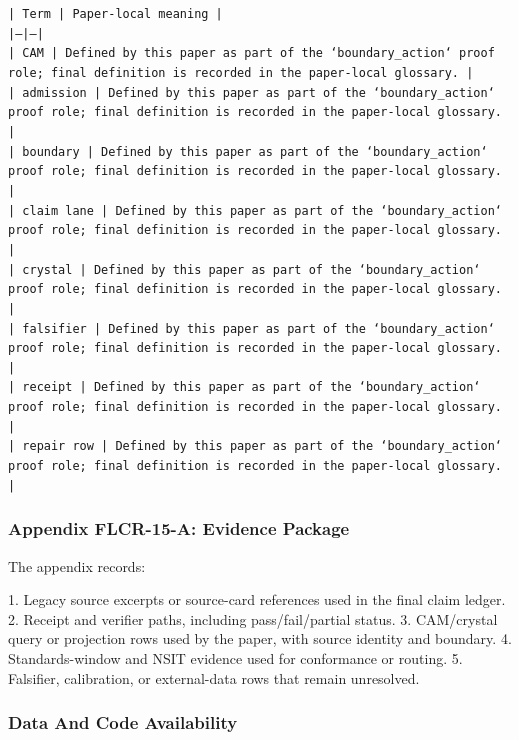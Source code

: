 \documentclass[11pt]{article}
\begin{document}
\noindent\texttt{| Term | Paper-local meaning |}\\
\noindent\texttt{|---|---|}\\
\noindent\texttt{| CAM | Defined by this paper as part of the `boundary\_action` proof role; final definition is recorded in the paper-local glossary. |}\\
\noindent\texttt{| admission | Defined by this paper as part of the `boundary\_action` proof role; final definition is recorded in the paper-local glossary. |}\\
\noindent\texttt{| boundary | Defined by this paper as part of the `boundary\_action` proof role; final definition is recorded in the paper-local glossary. |}\\
\noindent\texttt{| claim lane | Defined by this paper as part of the `boundary\_action` proof role; final definition is recorded in the paper-local glossary. |}\\
\noindent\texttt{| crystal | Defined by this paper as part of the `boundary\_action` proof role; final definition is recorded in the paper-local glossary. |}\\
\noindent\texttt{| falsifier | Defined by this paper as part of the `boundary\_action` proof role; final definition is recorded in the paper-local glossary. |}\\
\noindent\texttt{| receipt | Defined by this paper as part of the `boundary\_action` proof role; final definition is recorded in the paper-local glossary. |}\\
\noindent\texttt{| repair row | Defined by this paper as part of the `boundary\_action` proof role; final definition is recorded in the paper-local glossary. |}\\

\subsubsection*{Appendix FLCR-15-A: Evidence Package}

The appendix records:

1. Legacy source excerpts or source-card references used in the final claim ledger.
2. Receipt and verifier paths, including pass/fail/partial status.
3. CAM/crystal query or projection rows used by the paper, with source identity and boundary.
4. Standards-window and NSIT evidence used for conformance or routing.
5. Falsifier, calibration, or external-data rows that remain unresolved.

\subsubsection*{Data And Code Availability}
\end{document}
